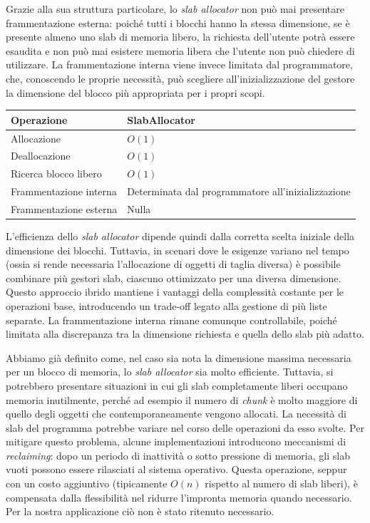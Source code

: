 Grazie alla sua struttura particolare, lo \textit{slab allocator} non può mai presentare frammentazione esterna: poiché tutti i blocchi hanno la stessa dimensione, se è presente almeno uno slab di memoria libero, la richiesta dell’utente potrà essere esaudita e non può mai esistere memoria libera che l’utente non può chiedere di utilizzare. La frammentazione interna viene invece limitata dal programmatore, che, conoscendo le proprie necessità, può scegliere all’inizializzazione del gestore la dimensione del blocco più appropriata per i propri scopi.

\begin{center}
\begin{tabular}{|l|l|}
\hline
Operazione & SlabAllocator \\
\hline
Allocazione & $O(1)$ \\
Deallocazione & $O(1)$ \\
Ricerca blocco libero & $O(1)$ \\
Frammentazione interna & Determinata dal programmatore all'inizializzazione \\
Frammentazione esterna & Nulla \\
\hline
\end{tabular}
\end{center}

L’efficienza dello \textit{slab allocator} dipende quindi dalla corretta scelta iniziale della dimensione dei blocchi. Tuttavia, in scenari dove le esigenze variano nel tempo (ossia si rende necessaria l’allocazione di oggetti di taglia diversa) è possibile combinare più gestori slab, ciascuno ottimizzato per una diversa dimensione. Questo approccio ibrido mantiene i vantaggi della complessità costante per le operazioni base, introducendo un trade-off legato alla gestione di più liste separate. La frammentazione interna rimane comunque controllabile, poiché limitata alla discrepanza tra la dimensione richiesta e quella dello slab più adatto.

Abbiamo già definito come, nel caso sia nota la dimensione massima necessaria per un blocco di memoria, lo \textit{slab allocator} sia molto efficiente. Tuttavia, si potrebbero presentare situazioni in cui gli slab completamente liberi occupano memoria inutilmente, perché ad esempio il numero di \textit{chunk} è molto maggiore di quello degli oggetti che contemporaneamente vengono allocati. La necessità di slab del programma potrebbe variare nel corso delle operazioni da esso svolte. Per mitigare questo problema, alcune implementazioni introducono meccanismi di \textit{reclaiming}: dopo un periodo di inattività o sotto pressione di memoria, gli slab vuoti possono essere rilasciati al sistema operativo. Questa operazione, seppur con un costo aggiuntivo (tipicamente $O(n)$ rispetto al numero di slab liberi), è compensata dalla flessibilità nel ridurre l’impronta memoria quando necessario. Per la nostra applicazione ciò non è stato ritenuto necessario.

